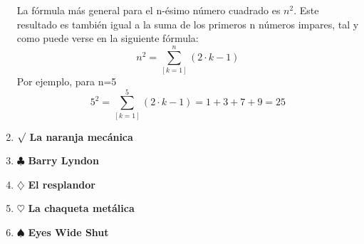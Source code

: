 \documentclass[12pt,a4paper]{article}
\begin{document}
\begin{enumerate}
La fórmula más general para el n-ésimo número cuadrado es $n^2$. Este resultado es también igual a la suma de los primeros n números impares, tal y como puede verse en la siguiente fórmula:
\begin{equation}
n^2=\sum_{[k=1]}^n(2 \cdot k -1)
\end{equation}
Por ejemplo, para n=5
\begin{equation}
5^2=\sum_{[k=1]}^5(2 \cdot k -1)= 1 + 3 + 7 + 9 = 25
\end{equation}

\item $\surd$ \textbf{La naranja mecánica}

\item $\clubsuit$ \textbf{Barry Lyndon}

\item $\diamondsuit$ \textbf{El resplandor}

\item $\heartsuit$ \textbf{La chaqueta metálica}

\item $\spadesuit$ \textbf{Eyes Wide Shut}

\end{enumerate}
\end{document}
